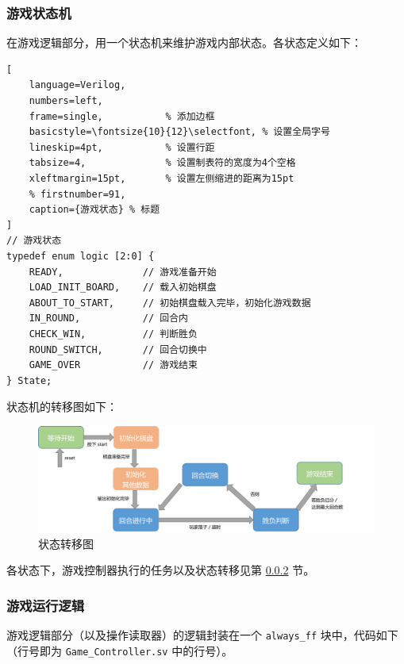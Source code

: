 \subsubsection{游戏状态机}
在游戏逻辑部分，用一个状态机来维护游戏内部状态。各状态定义如下：
\begin{lstlisting}[
    language=Verilog,
    numbers=left,
    frame=single,           % 添加边框
    basicstyle=\fontsize{10}{12}\selectfont, % 设置全局字号
    lineskip=4pt,           % 设置行距
    tabsize=4,              % 设置制表符的宽度为4个空格
    xleftmargin=15pt,       % 设置左侧缩进的距离为15pt
    % firstnumber=91,
    caption={游戏状态} % 标题
] 
// 游戏状态
typedef enum logic [2:0] {
    READY,              // 游戏准备开始
    LOAD_INIT_BOARD,    // 载入初始棋盘
    ABOUT_TO_START,     // 初始棋盘载入完毕，初始化游戏数据
    IN_ROUND,           // 回合内
    CHECK_WIN,          // 判断胜负
    ROUND_SWITCH,       // 回合切换中
    GAME_OVER           // 游戏结束
} State;
\end{lstlisting}

状态机的转移图如下：
\begin{figure}[H]
    \centering
    \includegraphics[scale=0.55]{images/states.png}
    \caption{状态转移图}
    \label{fig:state-transfer}
\end{figure}

各状态下，游戏控制器执行的任务以及状态转移见第 \ref{subsubsection:logic} 节。


\subsubsection{游戏运行逻辑} \label{subsubsection:logic}
游戏逻辑部分（以及操作读取器）的逻辑封装在一个 \texttt{always\_ff} 块中，代码如下（行号即为 \texttt{Game\_Controller.sv} 中的行号）。

